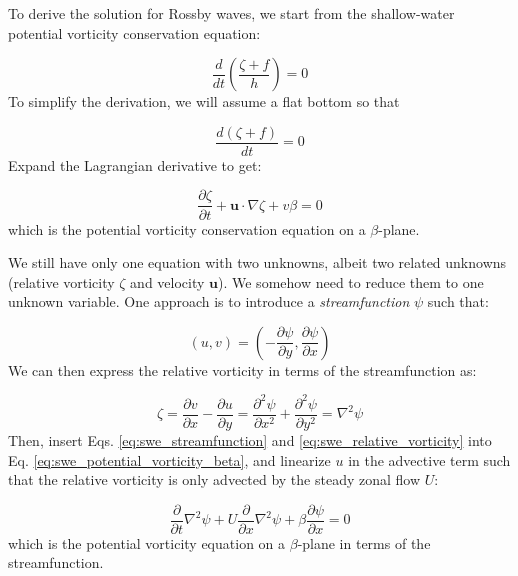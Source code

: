 \documentclass[12pt]{article}
\numberwithin{equation}{section}
\numberwithin{figure}{section}
\numberwithin{table}{section}
\begin{document}
To derive the solution for Rossby waves, we start from the shallow-water potential
vorticity conservation equation:

\begin{equation}
  \frac{d}{dt} \left( \frac{\zeta + f}{h} \right) = 0
\end{equation}
To simplify the derivation, we will assume a flat bottom so that

\begin{equation}
  \frac{d(\zeta + f)}{dt} = 0
\end{equation}
Expand the Lagrangian derivative to get:

\begin{equation}
  \frac{\partial \zeta}{\partial t} + \mathbf{u} \cdot \nabla \zeta + v \beta = 0
  \label{eq:swe_potential_vorticity_beta}
\end{equation}
which is the potential vorticity conservation equation on a $\beta$-plane.

We still have only one equation with two unknowns, albeit two related unknowns 
(relative vorticity $\zeta$ and velocity $\mathbf{u}$).
We somehow need to reduce them to one unknown variable.
One approach is to introduce a \textit{streamfunction}
$\psi$ such that:

\begin{equation}
  (u, v) = \left( - \frac{\partial \psi}{\partial y}, \frac{\partial \psi}{\partial x} \right)
  \label{eq:swe_streamfunction}
\end{equation}
We can then express the relative vorticity in terms of the streamfunction as:

\begin{equation}
  \zeta = \frac{\partial v}{\partial x} - \frac{\partial u}{\partial y} =
  \frac{\partial^2 \psi}{\partial x^2} + \frac{\partial^2 \psi}{\partial y^2}
  = \nabla^2 \psi
  \label{eq:swe_relative_vorticity}
\end{equation}
Then, insert Eqs. \ref{eq:swe_streamfunction} and \ref{eq:swe_relative_vorticity}
into Eq. \ref{eq:swe_potential_vorticity_beta}, and linearize $u$ in the
advective term such that the relative vorticity is only advected by the steady
zonal flow $U$:

\begin{equation}
  \frac{\partial}{\partial t} \nabla^2 \psi + U \frac{\partial}{\partial x} \nabla^2 \psi + \beta \frac{\partial \psi}{\partial x} = 0
  \label{eq:swe_streamfunction_beta}
\end{equation}
which is the potential vorticity equation on a $\beta$-plane in terms of the
streamfunction.
\end{document}

